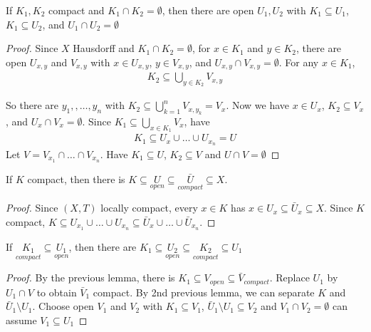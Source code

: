 \begin{lemma}
	If $K_{1}, K_{2}$ compact and $K_{1} \cap K_2 = \emptyset$, then there are open $U_{1} , U_{2}$ with $K_{1} \subseteq U_{1}$, $K_{1} \subseteq U_{2}$, and $U_1 \cap U_2 = \emptyset$
\end{lemma}

\begin{proof}
	Since $X$ Hausdorff and $K_1 \cap K_2 = \emptyset$, for $x \in K_1$ and $y \in K_2$,
	there are open $U_{x,y}$ and $V_{x,y}$ with $x \in U_{x,y}$, $y \in V_{x,y}$,
	and $U_{x,y} \cap V_{x,y} = \emptyset$. For any $x \in K_1$,
	\begin{align*}
		K_2 \subseteq \bigcup_{y \in K_2} V_{x,y}
	\end{align*}

	So there are $y_1, ,\ldots , y_n$ with $K_2 \subseteq \bigcup_{k=1}^n V_{x, y_{k}} = V_{x}$.
	Now we have $x \in U_{x}$, $K_2 \subseteq V_x$, and $U_{x} \cap V_{x} = \emptyset$. Since $K_{1} \subseteq \bigcup_{x \in K_1} V_x$, have
	\begin{align*}
		K_1 \subseteq U_{x} \cup \ldots \cup U_{x_{n}} = U
	\end{align*}
	Let $V = V_{x_{1}} \cap \ldots \cap V_{x_{n}}$. Have $K_{1} \subseteq U$, $K_{2} \subseteq V$ and $U \cap V = \emptyset$
\end{proof}

\begin{lemma}
	If $K$ compact, then there is $K \subseteq \underset{open}{U} \subseteq \underset{compact}{\bar{U}} \subseteq X$.
\end{lemma}

\begin{proof}
	Since $(X,T)$ locally compact, every $x \in K$ has $x \in U_{x} \subseteq \bar{U}_x \subseteq X$.
	Since $K$ compact, $K \subseteq U_{x_1} \cup \ldots \cup U_{x_n} \subseteq \bar{U}_x \cup \ldots \cup \bar{U}_{x_{n}}$.
\end{proof}

\begin{lemma}
	If $\underset{compact}{K_1} \subseteq \underset{open}{U_1}$, then there are  $K_1 \subseteq \underset{open}{U_{2}} \subseteq \underset{compact}{K_2} \subseteq U_1$
\end{lemma}

\begin{proof}
	By the previous lemma, there is $K_1 \subseteq V_{open} \subseteq \bar{V}_{compact}$.
	Replace $U_{1}$ by $U_{1} \cap V$ to obtain $\bar{V}_{1}$ compact. By 2nd previous lemma, we can separate $K$ and $\bar{U}_1 \setminus U_{1}$.
	Choose open $V_1$ and $V_2$ with $K_{1} \subseteq V_{1}$,  $\bar{U}_1 \setminus U_1 \subseteq V_{2}$
	and $V_{1} \cap V_{2} = \emptyset$ can assume $V_{1} \subseteq U_{1}$
\end{proof}

